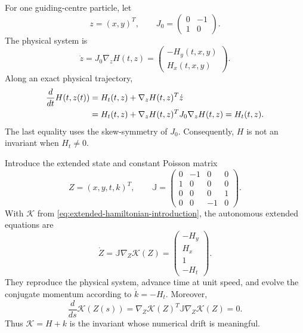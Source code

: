 \documentclass[11pt,a4paper]{article}
\theoremstyle{definition}
\theoremstyle{remark}
\newcommand{\J}{\mathbb{J}}
\newcommand{\K}{\mathcal{K}}
\begin{document}
For one guiding-centre particle, let
\[
 z=(x,y)^T,
 \qquad
 J_0=
 \begin{pmatrix}
  0&-1\\
  1&0
 \end{pmatrix}.
\]
The physical system is
\begin{equation}
 \dot z=J_0\nabla_zH(t,z)
 =
 \begin{pmatrix}
  -H_y(t,x,y)\\
  H_x(t,x,y)
 \end{pmatrix}.
 \label{eq:physical-hamiltonian-system}
\end{equation}
Along an exact physical trajectory,
\begin{align}
 \frac{d}{dt}H(t,z(t))
 &=H_t(t,z)+\nabla_zH(t,z)^T\dot z
 \notag\\
 &=H_t(t,z)+\nabla_zH(t,z)^TJ_0\nabla_zH(t,z)
 =H_t(t,z).
 \label{eq:physical-energy-change}
\end{align}
The last equality uses the skew-symmetry of $J_0$.  Consequently, $H$ is not
an invariant when $H_t\neq0$.

Introduce the extended state and constant Poisson matrix
\begin{equation}
 Z=(x,y,t,k)^T,
 \qquad
 \J=
 \begin{pmatrix}
  0&-1&0&0\\
  1&0&0&0\\
  0&0&0&1\\
  0&0&-1&0
 \end{pmatrix}.
 \label{eq:extended-poisson-matrix}
\end{equation}
With $\K$ from \eqref{eq:extended-hamiltonian-introduction}, the autonomous
extended equations are
\begin{equation}
 \dot Z=\J\nabla_Z\K(Z)
 =
 \begin{pmatrix}
  -H_y\\ H_x\\ 1\\ -H_t
 \end{pmatrix}.
 \label{eq:extended-system}
\end{equation}
They reproduce the physical system, advance time at unit speed, and evolve
the conjugate momentum according to $\dot k=-H_t$.  Moreover,
\begin{equation}
 \frac{d}{ds}\K(Z(s))
 =\nabla_Z\K(Z)^T\J\nabla_Z\K(Z)=0.
 \label{eq:exact-generalized-energy-conservation}
\end{equation}
Thus $\K=H+k$ is the invariant whose numerical drift is meaningful.
\end{document}
